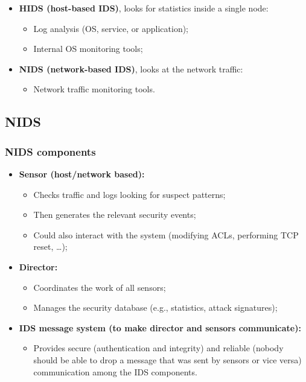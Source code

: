 \begin{itemize}
    \item \textbf{HIDS (host-based IDS)}, looks for statistics inside a single node:
        \begin{itemize}
            \item Log analysis (OS, service, or application);
            \item Internal OS monitoring tools;
        \end{itemize}
    \item \textbf{NIDS (network-based IDS)}, looks at the network traffic:
        \begin{itemize}
            \item Network traffic monitoring tools.
        \end{itemize}
\end{itemize}

\subsection{NIDS}

\subsubsection{NIDS components}
\begin{itemize}
    \item \textbf{Sensor (host/network based):}
        \begin{itemize}
            \item Checks traffic and logs looking for suspect patterns;
            \item Then generates the relevant security events;
            \item Could also interact with the system (modifying ACLs, performing TCP reset, …);
        \end{itemize}
    
    \item \textbf{Director:}
        \begin{itemize}
            \item Coordinates the work of all sensors;
            \item Manages the security database (e.g., statistics, attack signatures);
        \end{itemize}
    
    \item \textbf{IDS message system (to make director and sensors communicate):}
        \begin{itemize}
            \item Provides secure (authentication and integrity) and reliable (nobody should be able to drop a message that was sent by sensors or vice versa) communication among the IDS components.
        \end{itemize}
\end{itemize}

